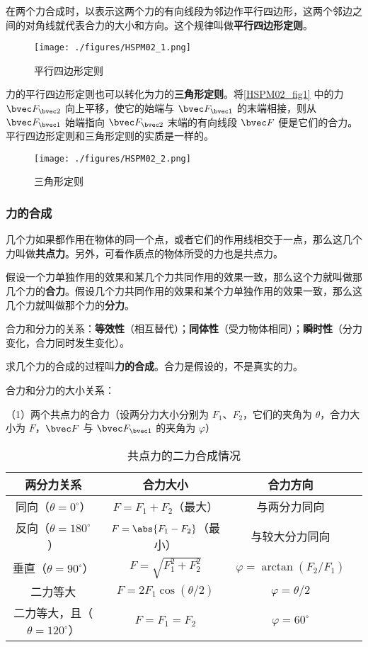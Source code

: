 在两个力合成时，以表示这两个力的有向线段为邻边作平行四边形，这两个邻边之间的对角线就代表合力的大小和方向。这个规律叫做\textbf{平行四边形定则}。
\begin{figure}[ht]
\centering
\texttt{[image: ./figures/HSPM02\_1.png]}
\caption{平行四边形定则} \label{HSPM02_fig1}
\end{figure}

力的平行四边形定则也可以转化为力的\textbf{三角形定则}。将\autoref{HSPM02_fig1} 中的力 $\bvec F_{\bvec 2}$ 向上平移，使它的始端与 $\bvec F_{\bvec 1}$ 的末端相接，则从 $\bvec F_{\bvec 1}$ 始端指向 $\bvec F_{\bvec 2}$ 末端的有向线段 $\bvec F$ 便是它们的合力。平行四边形定则和三角形定则的实质是一样的。
\begin{figure}[ht]
\centering
\texttt{[image: ./figures/HSPM02\_2.png]}
\caption{三角形定则} \label{HSPM02_fig2}
\end{figure}

\subsubsection{力的合成}
几个力如果都作用在物体的同一个点，或者它们的作用线相交于一点，那么这几个力叫做\textbf{共点力}。另外，可看作质点的物体所受的力也是共点力。

假设一个力单独作用的效果和某几个力共同作用的效果一致，那么这个力就叫做那几个力的\textbf{合力}。假设几个力共同作用的效果和某个力单独作用的效果一致，那么这几个力就叫做那个力的\textbf{分力}。

合力和分力的关系：\textbf{等效性}（相互替代）；\textbf{同体性}（受力物体相同）；\textbf{瞬时性}（分力变化，合力同时发生变化）。

求几个力的合成的过程叫\textbf{力的合成}。合力是假设的，不是真实的力。

合力和分力的大小关系：

（1）两个共点力的合力（设两分力大小分别为 $F_1$、$F_2$，它们的夹角为 $\theta$，合力大小为 $F$，$\bvec F$ 与 $\bvec F_{\bvec 1}$ 的夹角为 $\varphi $）

\begin{table}[ht]
\centering
\caption{共点力的二力合成情况}\label{HSPM02_tab1}
\begin{tabular}{|c|c|c|c|}
\hline
两分力关系 &  合力大小 & 合力方向 \\
\hline
同向（$\theta=0^{\circ}$） &  $F=F_1+F_2$（最大） & 与两分力同向 \\
\hline
反向（$\theta=180^{\circ}$） &  $F=\abs{F_1-F_2}$（最小） & 与较大分力同向 \\
\hline
垂直（$\theta=90^{\circ}$） &  $F=\sqrt{F_1^2+F_2^2}$ & $\varphi=\arctan{(F_2/F_1)}$ \\
\hline
二力等大 &  $F=2F_1\cos{(\theta/2)}$ & $\varphi=\theta/2$ \\
\hline
二力等大，且（$\theta=120^{\circ}$） &  $F=F_1=F_2$ & $\varphi=60^{\circ}$ \\
\hline
\end{tabular}
\end{table}

